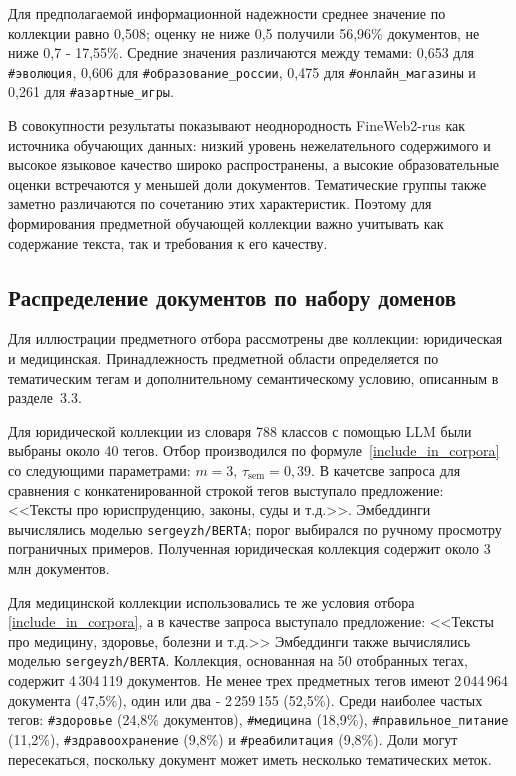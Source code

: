 \documentclass[12pt,a4paper]{article}
\begin{document}
Для предполагаемой информационной надежности среднее значение по коллекции равно 0,508;
оценку не ниже 0,5 получили 56,96\% документов, не ниже 0,7 - 17,55\%.
Средние значения различаются между темами: 0,653 для \texttt{\#эволюция},
0,606 для \texttt{\#образование\_россии}, 0,475 для \texttt{\#онлайн\_магазины}
и 0,261 для \texttt{\#азартные\_игры}.

В совокупности результаты показывают неоднородность FineWeb2-rus как источника обучающих данных:
низкий уровень нежелательного содержимого и высокое языковое качество широко распространены,
а высокие образовательные оценки встречаются у меньшей доли документов.
Тематические группы также заметно различаются по сочетанию этих характеристик.
Поэтому для формирования предметной обучающей коллекции важно учитывать
как содержание текста, так и требования к его качеству.

\subsection{Распределение документов по набору доменов}
Для иллюстрации предметного отбора рассмотрены две коллекции: юридическая и медицинская.
Принадлежность предметной области определяется по тематическим тегам и дополнительному
семантическому условию, описанным в разделе~3.3.

Для юридической коллекции из словаря 788 классов с помощью LLM были выбраны
около 40 тегов. Отбор производился по формуле~\eqref{include_in_corpora} со следующими параметрами: $m=3$, $\tau_{\mathrm{sem}}=0{,}39$. 
В качетсве запроса для сравнения с конкатенированной строкой тегов выступало предложение: 
<<Тексты про юриспруденцию, законы, суды и т.д.>>.
Эмбеддинги вычислялись моделью \texttt{sergeyzh/BERTA}; порог выбирался
по ручному просмотру пограничных примеров.
Полученная юридическая коллекция содержит около 3 млн документов.

Для медицинской коллекции использовались те же условия отбора
\eqref{include_in_corpora}, а в качестве запроса выступало предложение: <<Тексты про медицину, здоровье, болезни и т.д.>>
Эмбеддинги также вычислялись моделью \texttt{sergeyzh/BERTA}.
Коллекция, основанная на 50 отобранных тегах, содержит 4\,304\,119 документов.
Не менее трех предметных тегов имеют 2\,044\,964 документа (47,5\%),
один или два - 2\,259\,155 (52,5\%). Среди наиболее частых тегов:
\texttt{\#здоровье} (24,8\% документов), \texttt{\#медицина} (18,9\%),
\texttt{\#правильное\_питание} (11,2\%), \texttt{\#здравоохранение} (9,8\%)
и \texttt{\#реабилитация} (9,8\%). Доли могут пересекаться, поскольку документ
может иметь несколько тематических меток.
\end{document}
